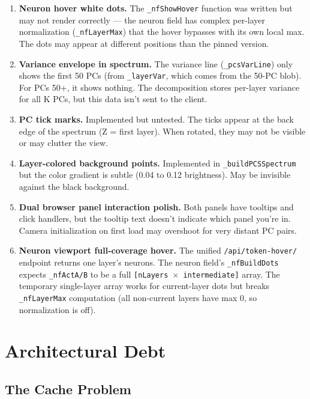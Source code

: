 \documentclass[11pt,a4paper]{article}
\begin{document}
\begin{enumerate}
  \item \textbf{Neuron hover white dots.} The \texttt{\_nfShowHover} function was written but may not render correctly --- the neuron field has complex per-layer normalization (\texttt{\_nfLayerMax}) that the hover bypasses with its own local max. The dots may appear at different positions than the pinned version.

  \item \textbf{Variance envelope in spectrum.} The variance line (\texttt{\_pcsVarLine}) only shows the first 50 PCs (from \texttt{\_layerVar}, which comes from the 50-PC blob). For PCs 50+, it shows nothing. The decomposition stores per-layer variance for all K PCs, but this data isn't sent to the client.

  \item \textbf{PC tick marks.} Implemented but untested. The ticks appear at the back edge of the spectrum (Z = first layer). When rotated, they may not be visible or may clutter the view.

  \item \textbf{Layer-colored background points.} Implemented in \texttt{\_buildPCSSpectrum} but the color gradient is subtle (0.04 to 0.12 brightness). May be invisible against the black background.

  \item \textbf{Dual browser panel interaction polish.} Both panels have tooltips and click handlers, but the tooltip text doesn't indicate which panel you're in. Camera initialization on first load may overshoot for very distant PC pairs.

  \item \textbf{Neuron viewport full-coverage hover.} The unified \texttt{/api/token-hover/} endpoint returns one layer's neurons. The neuron field's \texttt{\_nfBuildDots} expects \texttt{\_nfActA/B} to be a full \texttt{[nLayers $\times$ intermediate]} array. The temporary single-layer array works for current-layer dots but breaks \texttt{\_nfLayerMax} computation (all non-current layers have max 0, so normalization is off).
\end{enumerate}

\section{Architectural Debt}

\subsection{The Cache Problem}
\end{document}
